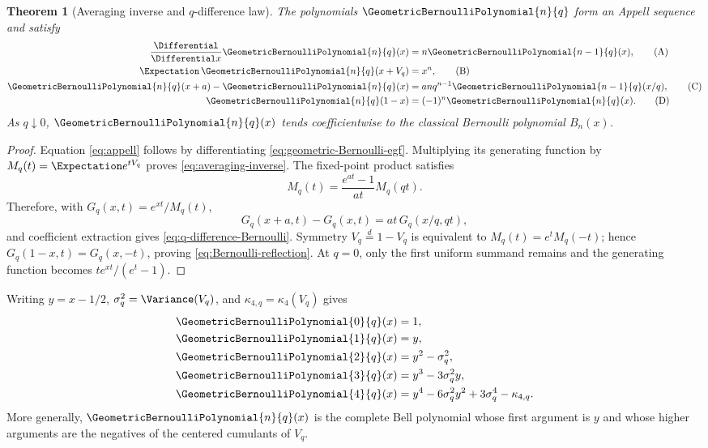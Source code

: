 \documentclass[11pt,oneside]{article}
\newtheorem{theorem}{Theorem}[section]
\theoremstyle{definition}
\theoremstyle{remark}
\begin{document}
\begin{theorem}[Averaging inverse and $q$-difference law]
\label{thm:geometric-Bernoulli}
The polynomials $\GeometricBernoulliPolynomial{n}{q}$ form an Appell sequence and satisfy
\begin{align}
 \frac{\Differential}{\Differential x}\GeometricBernoulliPolynomial{n}{q}(x)&=n\GeometricBernoulliPolynomial{n-1}{q}(x),
 \label{eq:appell}\tag{A}\\
 \Expectation\,\GeometricBernoulliPolynomial{n}{q}(x+V_q)&=x^n,
 \label{eq:averaging-inverse}\tag{B}\\
 \GeometricBernoulliPolynomial{n}{q}(x+a)-\GeometricBernoulliPolynomial{n}{q}(x)
 &=anq^{n-1}\GeometricBernoulliPolynomial{n-1}{q}(x/q),
 \label{eq:q-difference-Bernoulli}\tag{C}\\
 \GeometricBernoulliPolynomial{n}{q}(1-x)&=(-1)^n\GeometricBernoulliPolynomial{n}{q}(x).
 \label{eq:Bernoulli-reflection}\tag{D}
\end{align}
As $q\downarrow0$, $\GeometricBernoulliPolynomial{n}{q}(x)$ tends coefficientwise to the classical Bernoulli
polynomial $B_n(x)$.
\end{theorem}

\begin{proof}
Equation \eqref{eq:appell} follows by differentiating
\eqref{eq:geometric-Bernoulli-egf}.  Multiplying its generating function by
$M_q(t)=\Expectation e^{tV_q}$ proves \eqref{eq:averaging-inverse}.  The fixed-point product
satisfies
\[
 M_q(t)=\frac{e^{at}-1}{at}M_q(qt).
\]
Therefore, with $G_q(x,t)=e^{xt}/M_q(t)$,
\[
 G_q(x+a,t)-G_q(x,t)=at\,G_q(x/q,qt),
\]
and coefficient extraction gives \eqref{eq:q-difference-Bernoulli}.  Symmetry
$V_q\overset d=1-V_q$ is equivalent to $M_q(t)=e^tM_q(-t)$; hence
$G_q(1-x,t)=G_q(x,-t)$, proving \eqref{eq:Bernoulli-reflection}.  At $q=0$, only the
first uniform summand remains and the generating function becomes
$te^{xt}/(e^t-1)$.
\end{proof}

Writing $y=x-1/2$, $\sigma_q^2=\Variance(V_q)$, and $\kappa_{4,q}=\kappa_4(V_q)$ gives
\begin{align}
 \GeometricBernoulliPolynomial{0}{q}(x)&=1,\\
 \GeometricBernoulliPolynomial{1}{q}(x)&=y,\\
 \GeometricBernoulliPolynomial{2}{q}(x)&=y^2-\sigma_q^2,\\
 \GeometricBernoulliPolynomial{3}{q}(x)&=y^3-3\sigma_q^2y,\\
 \GeometricBernoulliPolynomial{4}{q}(x)&=y^4-6\sigma_q^2y^2+3\sigma_q^4-\kappa_{4,q}.
\end{align}
More generally, $\GeometricBernoulliPolynomial{n}{q}(x)$ is the complete Bell polynomial whose first argument
is $y$ and whose higher arguments are the negatives of the centered cumulants of
$V_q$.
\end{document}
